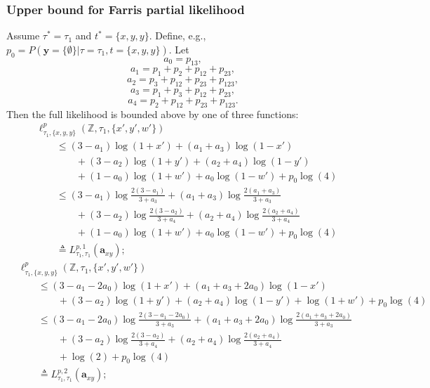\documentclass[a4paper]{article}
\newcommand{\alignmentColumn}{\mathbf{y}}
\newcommand{\fullAncestralStateCategories}{\mathbb{Z}}
\begin{document}
\subsubsection{Upper bound for Farris partial likelihood}

Assume $\tau^*=\tau_1$ and $t^*=\{x,y,y\}$.
Define, e.g., $p_0 = P(\alignmentColumn=\{\emptyset\}|\tau=\tau_1,t=\{x,y,y\})$.
Let
$$
    a_{0} = p_{13},
$$
$$
    a_{1} = p_1+p_2+p_{12}+p_{23},
$$
$$
    a_{2} = p_3+p_{12}+p_{23}+p_{123},
$$
$$
    a_{3} = p_1+p_3+p_{12}+p_{23},
$$
$$
    a_{4} = p_2+p_{12}+p_{23}+p_{123}.
$$
Then the full likelihood is bounded above by one of three functions:
\begin{align*}
    & \ell^p_{\tau_1,\{x,y,y\}}(\fullAncestralStateCategories,\tau_1,\{x',y',w'\}) \\
    &\qquad \le (3-a_{1})\log(1+x')+(a_{1}+a_{3})\log(1-x')\\
    &\qquad \qquad +(3-a_{2})\log(1+y')+(a_{2}+a_{4})\log(1-y')\\
    &\qquad \qquad +(1-a_{0})\log(1+w')+a_{0}\log(1-w')+p_{0}\log(4)\\
    &\qquad \le (3-a_{1})\log\frac{2(3-a_{1})}{3+a_{3}}+(a_{1}+a_{3})\log\frac{2(a_{1}+a_{3})}{3+a_{3}}\\
    &\qquad \qquad +(3-a_{2})\log\frac{2(3-a_{2})}{3+a_{4}}+(a_{2}+a_{4})\log\frac{2(a_{2}+a_{4})}{3+a_{4}}\\
    &\qquad \qquad +(1-a_{0})\log(1+w')+a_{0}\log(1-w')+p_{0}\log(4)\\
    &\qquad \triangleq L^{p,1}_{\tau_1,\tau_1}(\mathbf{a}_{xy});
\end{align*}
\begin{align*}
    & \ell^p_{\tau_1,\{x,y,y\}}(\fullAncestralStateCategories,\tau_1,\{x',y',w'\}) \\
    &\qquad \le (3-a_{1}-2a_{0})\log(1+x')+(a_{1}+a_{3}+2a_{0})\log(1-x')\\
    &\qquad \qquad +(3-a_{2})\log(1+y')+(a_{2}+a_{4})\log(1-y')+\log(1+w')+p_{0}\log(4)\\
    &\qquad \le (3-a_{1}-2a_{0})\log\frac{2(3-a_{1}-2a_{0})}{3+a_{3}}+(a_{1}+a_{3}+2a_{0})\log\frac{2(a_{1}+a_{3}+2a_{0})}{3+a_{3}}\\
    &\qquad \qquad +(3-a_{2})\log\frac{2(3-a_{2})}{3+a_{4}}+(a_{2}+a_{4})\log\frac{2(a_{2}+a_{4})}{3+a_{4}}\\
    &\qquad \qquad +\log(2)+p_{0}\log(4)\\
    &\qquad \triangleq L^{p,2}_{\tau_1,\tau_1}(\mathbf{a}_{xy});
\end{align*}
\end{document}
